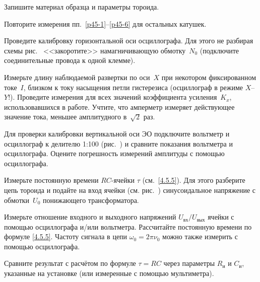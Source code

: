 \begin{lab:task}
\item \label{p45-6} Запишите материал образца и параметры тороида.

\item Повторите измерения пп.~\ref{p45-1}--\ref{p45-6} 
для остальных катушек.


\item \label{p45-8}
Проведите калибровку горизонтальной оси осциллографа. 
Для этого не разбирая схемы рис.~ 
<<закоротите>> намагничивающую обмотку~$N_0$ 
(подключите соединительные провода к одной клемме). 

Измерьте длину наблюдаемой развертки по оси~$X$ при некотором фиксированном 
токе~$I$, близком к току насыщения петли гистерезиса 
(осциллограф в режиме $X$--$Y$!). 
Проведите измерения для всех значений коэффициента усиления~$K_x$, 
использовавшихся в работе. 
Учтите, что амперметр измеряет действующее значение тока, 
меньшее амплитудного в~$\sqrt{2}$ раз.

\item
Для проверки калибровки вертикальной оси ЭО подключите вольтметр и осциллограф 
к делителю 1:100 (рис.~) и сравните показания
вольтметра и осциллографа. Оцените погрешность измерений амплитуды
с помощью осциллографа.


\item
Измерьте постоянную времени $RC$-ячейки $\tau$ (см.~\eqref{4.5.5}). 
Для этого разберите цепь тороида и подайте на вход ячейки
(см. рис.~) синусоидальное напряжение 
с обмотки~$U_0$ понижающего трансформатора.

Измерьте отношение входного и выходного напряжений 
$U_\text{вх} / U_\text{вых}$ ячейки с помощью осциллографа и/или вольтметра.
Рассчитайте постоянную времени по формуле \eqref{4.5.5}.
Частоту сигнала в цепи $\omega_0=2\pi\nu_0$ 
можно также измерить с помощью осциллографа.


\item Сравните результат с расчётом по формуле $\tau=RC$ через 
параметры $R_\text{и}$ и $C_\text{и}$, указанные на установке
(или измеренные с помощью мультиметра).





\end{lab:task}
